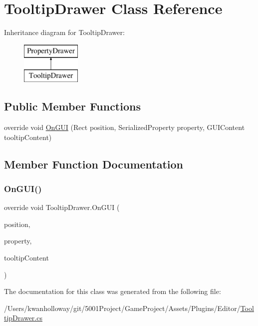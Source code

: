 \hypertarget{class_tooltip_drawer}{}\section{Tooltip\+Drawer Class Reference}
\label{class_tooltip_drawer}
Inheritance diagram for Tooltip\+Drawer\+:\begin{figure}[H]
\begin{center}
\leavevmode
\includegraphics[height=2.000000cm]{class_tooltip_drawer}
\end{center}
\end{figure}
\subsection*{Public Member Functions}
\begin{DoxyCompactItemize}
\item 
override void \hyperlink{class_tooltip_drawer_a1cd734d3aa79438ca2641e136937f740}{On\+G\+UI} (Rect position, Serialized\+Property property, G\+U\+I\+Content tooltip\+Content)
\end{DoxyCompactItemize}


\subsection{Member Function Documentation}
\mbox{\label{class_tooltip_drawer_a1cd734d3aa79438ca2641e136937f740}} 
\subsubsection{\texorpdfstring{On\+G\+U\+I()}{OnGUI()}}
{\footnotesize\ttfamily override void Tooltip\+Drawer.\+On\+G\+UI (\begin{DoxyParamCaption}\item[{Rect}]{position,  }\item[{Serialized\+Property}]{property,  }\item[{G\+U\+I\+Content}]{tooltip\+Content }\end{DoxyParamCaption})}



The documentation for this class was generated from the following file\+:\begin{DoxyCompactItemize}
\item 
/\+Users/kwanholloway/git/5001\+Project/\+Game\+Project/\+Assets/\+Plugins/\+Editor/\hyperlink{_tooltip_drawer_8cs}{Tooltip\+Drawer.\+cs}\end{DoxyCompactItemize}
